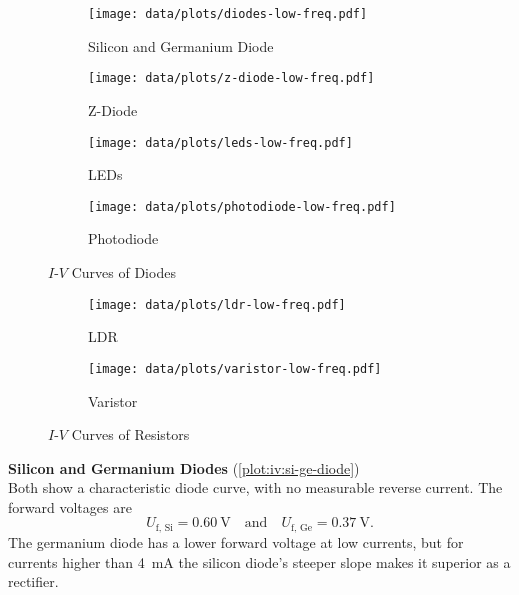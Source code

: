 \begin{figure}[tbp]
	\centering

	\begin{subfigure}{\ivsubfigwidth}
		\centering
		\texttt{[image: data/plots/diodes-low-freq.pdf]}
		\caption{Silicon and Germanium Diode}
		\label{plot:iv:si-ge-diode}
	\end{subfigure}
	\begin{subfigure}{\ivsubfigwidth}
		\centering
		\texttt{[image: data/plots/z-diode-low-freq.pdf]}
		\caption{Z-Diode}
		\label{plot:iv:z-diode}
	\end{subfigure}

%

	\begin{subfigure}{\ivsubfigwidth}
		\centering
		\texttt{[image: data/plots/leds-low-freq.pdf]}
		\caption{LEDs}
		\label{plot:iv:leds}
	\end{subfigure}
	\begin{subfigure}{\ivsubfigwidth}
		\centering
		\texttt{[image: data/plots/photodiode-low-freq.pdf]}
		\caption{Photodiode}
		\label{plot:iv:photodiode}
	\end{subfigure}

	\caption{$I$-$V$ Curves of Diodes}
	\label{plot:iv:diodes}
\end{figure}

\begin{figure}[tbp]
	\centering

	\begin{subfigure}{\ivsubfigwidth}
		\centering
		\texttt{[image: data/plots/ldr-low-freq.pdf]}
		\caption{LDR}
		\label{plot:iv:ldr}
	\end{subfigure}
	\begin{subfigure}{\ivsubfigwidth}
		\centering
		\texttt{[image: data/plots/varistor-low-freq.pdf]}
		\caption{Varistor}
		\label{plot:iv:varistor}
	\end{subfigure}

	\caption{$I$-$V$ Curves of Resistors}	%
	\label{plot:iv:boring}
\end{figure}


\textbf{Silicon and Germanium Diodes} (\autoref{plot:iv:si-ge-diode})\\
Both show a characteristic diode curve, with no measurable reverse current.
The forward voltages are
\begin{equation*}
	U_\text{f, Si} = \SI{0.60}{\volt} \quad \text{and} \quad U_\text{f, Ge} = \SI{0.37}{\volt}.
\end{equation*}
The germanium diode has a lower forward voltage at low currents, but for currents higher than \SI{4}{\mA} the silicon diode's steeper slope makes it superior as a rectifier.


